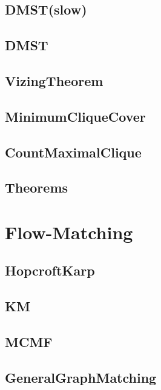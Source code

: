 	\subsection{DMST(slow)}
	
	\subsection{DMST}
	
	\subsection{VizingTheorem}
	
	\subsection{MinimumCliqueCover}
	
	\subsection{CountMaximalClique}
	
	\subsection{Theorems}
	
\section{Flow-Matching}
	\subsection{HopcroftKarp}
	
	\subsection{KM}
	
	\subsection{MCMF}
	
	\subsection{GeneralGraphMatching}
	
